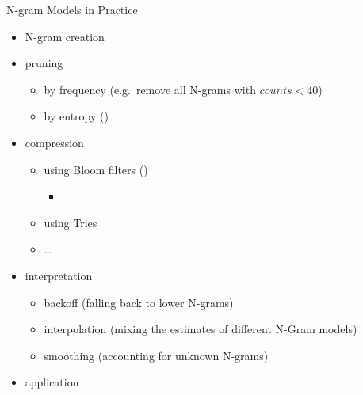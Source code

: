 \documentclass[16:9,en,navbarinfooter]{sdqbeamer}
\begin{document}
\begin{frame}{N-gram Models in Practice}
\vspace{1cm}
\begin{itemize}
	\item N-gram creation
	\item pruning
	\begin{itemize}
		\item by frequency (e.g.\ remove all N-grams with $counts < 40$)
		\item by entropy (\cite{Stolcke98})
	\end{itemize}
\item compression
	\begin{itemize}
		\item using Bloom filters (\cite{Talbot07})
        \begin{itemize}
                \item
        \end{itemize}
		\item using Tries
		\item \dots
	\end{itemize}
	\item {interpretation}
	\begin{itemize}
		\item backoff (falling back to lower N-grams)
		\item interpolation (mixing the estimates of different N-Gram models)
		\item smoothing (accounting for unknown N-grams)
		\end{itemize}
	\item application
	
\end{itemize}
\end{frame}
\backupend{}
\end{document}
